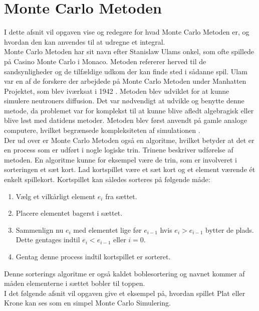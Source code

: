 \documentclass[../../SRP.tex]{subfiles}
\begin{document}
\chapter{Monte Carlo Metoden}

I dette afsnit vil opgaven vise og redegøre for hvad Monte Carlo Metoden er, og hvordan den kan anvendes til at udregne et integral. \\

Monte Carlo Metoden har sit navn efter Stanislaw Ulams onkel, som ofte spillede på Casino Monte Carlo i Monaco. Metoden refererer herved til de sandsynligheder og de tilfældige udkom der kan finde sted i sådanne spil. Ulam var en af de forskere der arbejdede på Monte Carlo Metoden under Manhatten Projektet, som blev iværksat i 1942 \cite{MSD}. Metoden blev udviklet for at kunne simulere neutroners diffusion. Det var nødvendigt at udvikle og benytte denne metode, da problemet var for komplekst til at kunne blive afledt algebragisk eller blive løst med datidens metoder. Metoden blev først anvendt på gamle analoge computere, hvilket begrænsede kompleksiteten af simulationen \cite{AHF}. \\

Der ud over er Monte Carlo Metoden også en algoritme, hvilket betyder at det er en process som er udført i nogle logiske trin. Trinene beskriver udførelse af metoden. En algoritme kunne for eksempel være de trin, som er involveret i sorteringen et sæt kort. Lad kortspillet være et sæt kort og et element værende ét enkelt spillekort. Kortspillet kan således sorteres på følgende måde:
\begin{enumerate}
  \item Vælg et vilkårligt element $e_i$ fra sættet.
  
  \item Placere elementet bagerst i sættet.

  \item Sammenlign nu $e_i$ med elementet lige før $e_{i-1}$ hvis $e_i > e_{i-1}$ bytter de plads. Dette gentages indtil $e_i < e_{i-1}$ eller $i = 0$.

  \item Gentag denne process indtil kortspillet er sorteret.
\end{enumerate}
Denne sorterings algoritme er også kaldet boblesortering og navnet kommer af måden elementerne i sættet bobler til toppen. \cite{BS} \\

I det følgende afsnit vil opgaven give et eksempel på, hvordan spillet Plat eller Krone kan ses som en simpel Monte Carlo Simulering.
\end{document}
